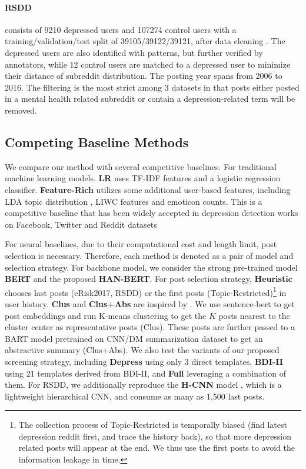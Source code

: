 \paragraph{RSDD} consists of 9210 depressed users and 107274 control users with a training/validation/test split of 39105/39122/39121, after data cleaning \citep{yates2017depression}. The depressed users are also identified with patterns, but further verified by annotators, while 12 control users are matched to a depressed user to minimize their distance of subreddit distribution. The posting year spans from 2006 to 2016. The filtering is the most strict among 3 datasets in that posts either posted in a mental health related subreddit or contain a depression-related term will be removed. 

\subsection{Competing Baseline Methods}
We compare our method with several competitive baselines. For traditional machine learning models. \textbf{LR} uses TF-IDF features and a logistic regression classifier. \textbf{Feature-Rich} utilizes some additional user-based features, including LDA topic distribution \citep{blei2003latent}, LIWC features \citep{pennebaker2001linguistic} and emoticon counts. This is a competitive baseline that has been widely accepted in depression detection works on Facebook, Twitter and Reddit datasets \citep{eichstaedt2018facebook,trotzek2018utilizing,harrigian2020models}

For neural baselines, due to their computational cost and length limit, post selection is necessary. Therefore, each method is denoted as a pair of model and selection strategy. For backbone model, we consider the strong pre-trained model \textbf{BERT} and the proposed \textbf{HAN-BERT}. For post selection strategy, \textbf{Heuristic} chooses last posts (eRisk2017, RSDD) or the first posts (Topic-Restricted)\footnote{The collection process of Topic-Restricted is temporally biased (find latest depression reddit first, and trace the history back), so that more depression related posts will appear at the end. We thus use the first posts to avoid the information leakage in time.} in user history. \textbf{Clus} and \textbf{Clus+Abs} are inspired by \citet{zogan2021depressionnet}. We use sentence-bert \citep{reimers-2019-sentence-bert} to get post embeddings and run K-means clustering to get the $K$ posts nearest to the cluster center as representative posts (Clus). These posts are further passed to a BART model \citep{lewis2020bart} pretrained on CNN/DM summarization dataset to get an abstractive summary (Clus+Abs). We also test the variants of our proposed screening strategy, including \textbf{Depress} using only 3 direct templates, \textbf{BDI-II} using 21 templates derived from BDI-II, and \textbf{Full} leveraging a combination of them. For RSDD, we additionally reproduce the \textbf{H-CNN} model \citep{yates2017depression}, which is a lightweight hierarchical CNN, and consume as many as 1,500 last posts.

